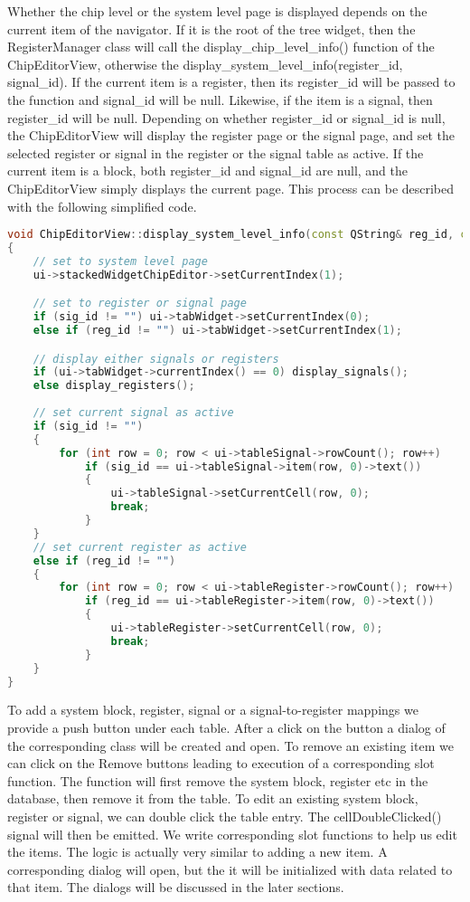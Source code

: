 Whether the chip level or the system level page is displayed depends on the current item of the navigator. If it is the root of the tree widget, then the RegisterManager class will call the display\_chip\_level\_info() function of the ChipEditorView, otherwise the display\_system\_level\_info(register\_id, signal\_id). If the current item is a register, then its register\_id will be passed to the function and signal\_id will be null. Likewise, if the item is a signal, then register\_id will be null. Depending on whether register\_id or signal\_id is null, the ChipEditorView will display the register page or the signal page, and set the selected register or signal in the register or the signal table as active. If the current item is a block, both register\_id and signal\_id are null, and the ChipEditorView simply displays the current page. This process can be described with the following simplified code.

\begin{lstlisting}[language=C++]
void ChipEditorView::display_system_level_info(const QString& reg_id, const QString& sig_id)
{
    // set to system level page
    ui->stackedWidgetChipEditor->setCurrentIndex(1);

    // set to register or signal page
    if (sig_id != "") ui->tabWidget->setCurrentIndex(0);
    else if (reg_id != "") ui->tabWidget->setCurrentIndex(1);

    // display either signals or registers
    if (ui->tabWidget->currentIndex() == 0) display_signals();
    else display_registers();
    
    // set current signal as active
    if (sig_id != "")
    {
        for (int row = 0; row < ui->tableSignal->rowCount(); row++)
            if (sig_id == ui->tableSignal->item(row, 0)->text())
            {
                ui->tableSignal->setCurrentCell(row, 0);
                break;
            }
    }
    // set current register as active
    else if (reg_id != "")
    {
        for (int row = 0; row < ui->tableRegister->rowCount(); row++)
            if (reg_id == ui->tableRegister->item(row, 0)->text())
            {
                ui->tableRegister->setCurrentCell(row, 0);
                break;
            }
    }
}
\end{lstlisting}

To add a system block, register, signal or a signal-to-register mappings we provide a push button under each table. After a click on the button a dialog of the corresponding class will be created and open. To remove an existing item we can click on the Remove buttons leading to execution of a corresponding slot function. The function will first remove the system block, register etc in the database, then remove it from the table. To edit an existing system block, register or signal, we can double click the table entry. The cellDoubleClicked() signal will then be emitted. We write corresponding slot functions to help us edit the items. The logic is actually very similar to adding a new item. A corresponding dialog will open, but the it will be initialized with data related to that item. The dialogs will be discussed in the later sections. 

